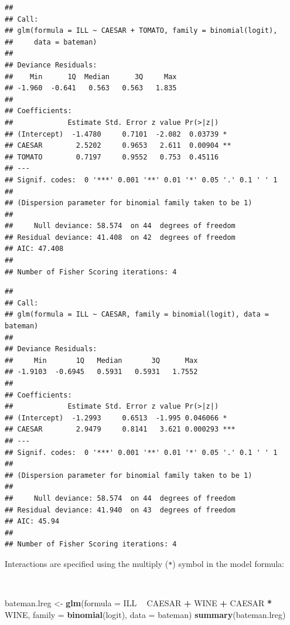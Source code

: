 \documentclass[12pt,a4paper]{book}
\newenvironment{Shaded}{\begin{snugshade}}{\end{snugshade}}
\newcommand{\KeywordTok}[1]{\textcolor[rgb]{0.13,0.29,0.53}{\textbf{#1}}}
\newcommand{\DataTypeTok}[1]{\textcolor[rgb]{0.13,0.29,0.53}{#1}}
\newcommand{\StringTok}[1]{\textcolor[rgb]{0.31,0.60,0.02}{#1}}
\newcommand{\OperatorTok}[1]{\textcolor[rgb]{0.81,0.36,0.00}{\textbf{#1}}}
\newcommand{\NormalTok}[1]{#1}
\theoremstyle{definition}
\theoremstyle{definition}
\theoremstyle{definition}
\theoremstyle{remark}
\begin{document}
\begin{verbatim}
## 
## Call:
## glm(formula = ILL ~ CAESAR + TOMATO, family = binomial(logit), 
##     data = bateman)
## 
## Deviance Residuals: 
##    Min      1Q  Median      3Q     Max  
## -1.960  -0.641   0.563   0.563   1.835  
## 
## Coefficients:
##             Estimate Std. Error z value Pr(>|z|)   
## (Intercept)  -1.4780     0.7101  -2.082  0.03739 * 
## CAESAR        2.5202     0.9653   2.611  0.00904 **
## TOMATO        0.7197     0.9552   0.753  0.45116   
## ---
## Signif. codes:  0 '***' 0.001 '**' 0.01 '*' 0.05 '.' 0.1 ' ' 1
## 
## (Dispersion parameter for binomial family taken to be 1)
## 
##     Null deviance: 58.574  on 44  degrees of freedom
## Residual deviance: 41.408  on 42  degrees of freedom
## AIC: 47.408
## 
## Number of Fisher Scoring iterations: 4
\end{verbatim}

\begin{verbatim}
## 
## Call:
## glm(formula = ILL ~ CAESAR, family = binomial(logit), data = bateman)
## 
## Deviance Residuals: 
##     Min       1Q   Median       3Q      Max  
## -1.9103  -0.6945   0.5931   0.5931   1.7552  
## 
## Coefficients:
##             Estimate Std. Error z value Pr(>|z|)    
## (Intercept)  -1.2993     0.6513  -1.995 0.046066 *  
## CAESAR        2.9479     0.8141   3.621 0.000293 ***
## ---
## Signif. codes:  0 '***' 0.001 '**' 0.01 '*' 0.05 '.' 0.1 ' ' 1
## 
## (Dispersion parameter for binomial family taken to be 1)
## 
##     Null deviance: 58.574  on 44  degrees of freedom
## Residual deviance: 41.940  on 43  degrees of freedom
## AIC: 45.94
## 
## Number of Fisher Scoring iterations: 4
\end{verbatim}

\newpage

Interactions are specified using the multiply (\texttt{*}) symbol in the
model formula:

~

\begin{Shaded}
\begin{Highlighting}[]
\NormalTok{bateman.lreg <-}\StringTok{ }\KeywordTok{glm}\NormalTok{(}\DataTypeTok{formula =}\NormalTok{ ILL }\OperatorTok{~}\StringTok{ }\NormalTok{CAESAR }\OperatorTok{+}\StringTok{ }\NormalTok{WINE }\OperatorTok{+}\StringTok{ }\NormalTok{CAESAR }\OperatorTok{*}\StringTok{ }\NormalTok{WINE,}
                    \DataTypeTok{family =} \KeywordTok{binomial}\NormalTok{(logit), }\DataTypeTok{data =}\NormalTok{ bateman)}
\KeywordTok{summary}\NormalTok{(bateman.lreg)}
\end{Highlighting}
\end{Shaded}
\end{document}
